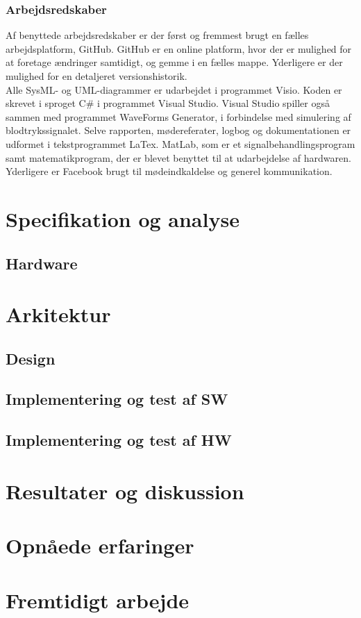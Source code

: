 \subsubsection{Arbejdsredskaber} 
Af benyttede arbejdsredskaber er der først og fremmest brugt en fælles arbejdsplatform, GitHub. GitHub er en online platform, hvor der er mulighed for at foretage ændringer samtidigt, og gemme i en fælles mappe. Yderligere er der mulighed for en detaljeret versionshistorik.\\
Alle SysML- og UML-diagrammer er udarbejdet i programmet Visio. Koden er skrevet i sproget C\# i programmet Visual Studio. Visual Studio spiller også sammen med programmet WaveForms Generator, i forbindelse med simulering af blodtrykssignalet. Selve rapporten, mødereferater, logbog og dokumentationen er udformet i tekstprogrammet LaTex. MatLab, som er et signalbehandlingsprogram samt matematikprogram, der er blevet benyttet til at udarbejdelse af hardwaren. Yderligere er Facebook brugt til mødeindkaldelse og generel kommunikation.




\section{Specifikation og analyse}
\subsection{Hardware}


\section{Arkitektur}
\subsection{Design}
\subsection{Implementering og test af SW}
\subsection{Implementering og test af HW}

\section{Resultater og diskussion}

\section{Opnåede erfaringer}

\section{Fremtidigt arbejde}


